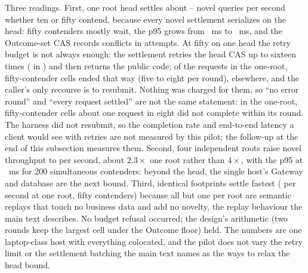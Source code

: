 \documentclass[journal,onecolumn]{IEEEtran}
\newcommand{\code}[1]{\texttt{\detokenize{#1}}}
\begin{document}
Three readings. First, one root head settles about
\ThroughputOneRootTenDisjointNPS{}--\ThroughputOneRootFiftyDisjointNPS{}
novel queries per second whether ten or fifty contend, because every novel
settlement serializes on the head: fifty contenders mostly wait, the p95
grows from \ThroughputOneRootTenDisjointPNinetyFive{}~ms to
\ThroughputOneRootFiftyDisjointPNinetyFive{}~ms, and the Outcome-set CAS
records \ThroughputOneRootFiftyDisjointConflicts{} conflicts in
\ThroughputOneRootFiftyDisjointAttempts{} attempts. At fifty on one head the
retry budget is not always enough: the settlement retries the head CAS up to
sixteen times (\code{ordinalCASMaxAttempts} in
) and then returns the public
\code{CONFLICT} code; \ThroughputOneRootFiftyRefused{} of the
\ThroughputOneRootFiftyRequests{} requests in the one-root, fifty-contender
cells ended that way (five to eight per round), \ThroughputOtherRefused{}
elsewhere, and the caller's only recourse is to resubmit. Nothing was
charged for them, so ``no error round'' and ``every request settled'' are
not the same statement: in the one-root, fifty-contender cells about one
request in eight did not complete within its round. The harness did not
resubmit, so the completion rate and end-to-end latency a client would see
with retries are not measured by this pilot; the follow-up at the end of
this subsection measures them. Second, four
independent roots raise novel throughput to
\ThroughputFourRootFiftyDisjointNPS{} per second, about $2.3\times$ one
root rather than $4\times$, with the p95 at
\ThroughputFourRootFiftyDisjointPNinetyFive{}~ms for 200 simultaneous
contenders: beyond the head, the single host's Gateway and database are the
next bound. Third, identical footprints settle fastest
(\ThroughputOneRootFiftyIdenticalSPS{} per second at one root, fifty
contenders) because all but one per root are semantic replays that touch
no business data and add no novelty, the replay behaviour the main text
describes. No budget refusal occurred; the design's arithmetic (two rounds
keep the largest cell under the Outcome floor) held. The numbers are one
laptop-class host with everything colocated, and the pilot does not vary
the retry limit or the settlement batching the main text names as the ways
to relax the head bound.
\end{document}
